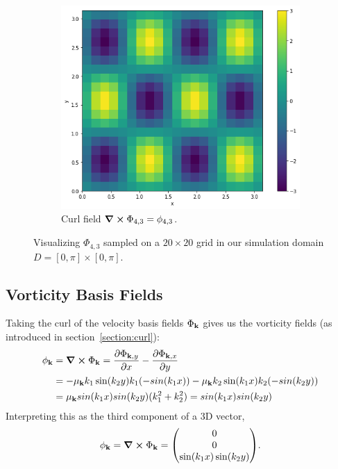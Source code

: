 \begin{figure}
\begin{subfigure}[t]{0.48\textwidth}
    \includegraphics[height=\textwidth]{figures/eigenfluids/k_4_3_curl_bar.png}
    \caption{Curl field $\curl{\Phi_{4,3}} = \phi_{4,3}$.}
  \end{subfigure}\par\medskip
  \caption{Visualizing $\Phi_{4,3}$ sampled on a $20 \times 20$ grid in
  our simulation domain $D = [0,\pi] \times [0,\pi]$.}
  \label{fig:phi-example}
\end{figure}

\subsection*{Vorticity Basis Fields}
Taking the curl of the velocity basis fields $\Phi_{\vb{k}}$ gives us the
vorticity fields (as introduced in section~\ref{section:curl}):
\begin{align*}
    \phi_{\vb{k}} &= \curl{\Phi_{\vb{k}}} 
    =  \pdv{\Phi_{\vb{k},y}}{x} - \pdv{\Phi_{\vb{k},x}}{y}\\
&= -\mu_{\vb{k}} k_1 \sin(k_2 y) k_1(-sin(k_1 x)) - \mu_{\vb{k}} k_2 \sin(k_1 x)
    k_2 (-sin(k_2 y))\\
&= \mu_{\vb{k}} sin(k_1 x) sin(k_2 y)(k_1^2+k_2^2) = sin(k_1 x) sin(k_2 y)
\end{align*}
Interpreting this as the third component of a 3D vector,
$$\phi_{\vb{k}} = \curl{\Phi_{\vb{k}}} 
= \mqty(0 \\ 0 \\ \sin(k_1 x) \sin(k_2 y)).$$


